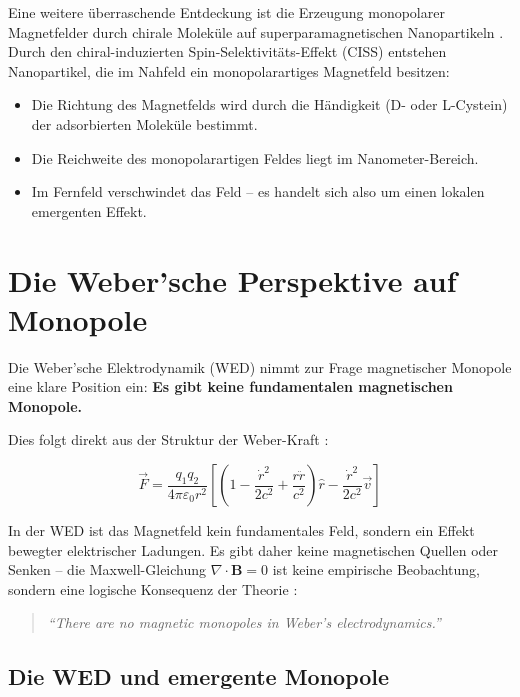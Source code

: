 Eine weitere überraschende Entdeckung ist die Erzeugung monopolarer Magnetfelder durch chirale Moleküle auf superparamagnetischen Nanopartikeln \cite{Small2024}. Durch den chiral-induzierten Spin-Selektivitäts-Effekt (CISS) entstehen Nanopartikel, die im Nahfeld ein monopolarartiges Magnetfeld besitzen:

\begin{itemize}
    \item Die Richtung des Magnetfelds wird durch die Händigkeit (D- oder L-Cystein) der adsorbierten Moleküle bestimmt.
    \item Die Reichweite des monopolarartigen Feldes liegt im Nanometer-Bereich.
    \item Im Fernfeld verschwindet das Feld – es handelt sich also um einen lokalen emergenten Effekt.
\end{itemize}

\section{Die Weber'sche Perspektive auf Monopole}
\label{app:monopolforschung_weber}

Die Weber'sche Elektrodynamik (WED) nimmt zur Frage magnetischer Monopole eine klare Position ein: \textbf{Es gibt keine fundamentalen magnetischen Monopole.}

Dies folgt direkt aus der Struktur der Weber-Kraft \cite{Assis2005, Assis2012}:

\[
\vec{F} = \frac{q_1 q_2}{4\pi \varepsilon_0 r^2}
\left[
\left(
1 - \frac{\dot{r}^2}{2c^2} + \frac{r\ddot{r}}{c^2}
\right) \hat{r}
- \frac{\dot{r}^2}{2c^2} \vec{v}
\right]
\]

In der WED ist das Magnetfeld kein fundamentales Feld, sondern ein Effekt bewegter elektrischer Ladungen. Es gibt daher keine magnetischen Quellen oder Senken – die Maxwell-Gleichung $\nabla \cdot \mathbf{B} = 0$ ist keine empirische Beobachtung, sondern eine logische Konsequenz der Theorie \cite{Assis2005}:

\begin{quote}
    \emph{``There are no magnetic monopoles in Weber's electrodynamics.''} \cite{Assis2005}
\end{quote}

\subsection{Die WED und emergente Monopole}
\label{app:monopolforschung_weber_emergent}

